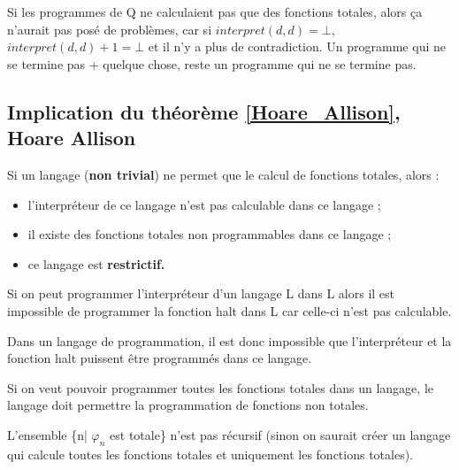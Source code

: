 \begin{myrem}
	Si les programmes de Q ne calculaient pas que des fonctions totales, alors ça n'aurait pas posé de problèmes, car si $interpret(d,d)=\bot$, $interpret(d,d)+1=\bot$ et il n'y a plus de contradiction.  Un programme qui ne se termine pas + quelque chose, reste un programme qui ne se termine pas.
\end{myrem}

\subsection[Implication du théorème de Hoare Allison]{Implication du théorème \ref{Hoare_Allison}, Hoare Allison}
\begin{myprop}
	Si un langage (\textbf{non trivial}) ne permet que le calcul de fonctions totales, alors :
	\begin{itemize}
		\item l'interpréteur de ce langage n'est pas calculable dans ce langage ;
		\item il existe des fonctions totales non programmables dans ce langage ;
		\item ce langage est \bf{restrictif}.
	\end{itemize}
\end{myprop}

\begin{myprop}
	Si on peut programmer l'interpréteur d'un langage L dans L alors il est
	impossible de programmer la fonction halt dans L car celle-ci n'est pas calculable.
\end{myprop}

\begin{myprop}
	Dans un langage de programmation, il est donc impossible que
	l'interpréteur et la fonction halt puissent être programmés dans ce langage.
\end{myprop}

\begin{myprop}
	Si on veut pouvoir programmer toutes les fonctions totales dans un langage, le langage doit permettre la programmation de fonctions non totales.
\end{myprop}

\begin{myprop}
	L'ensemble \{n| $\varphi_n$ est totale\} n'est pas récursif
    (sinon on saurait créer un langage qui calcule toutes les fonctions totales et uniquement les fonctions totales).
\end{myprop}

